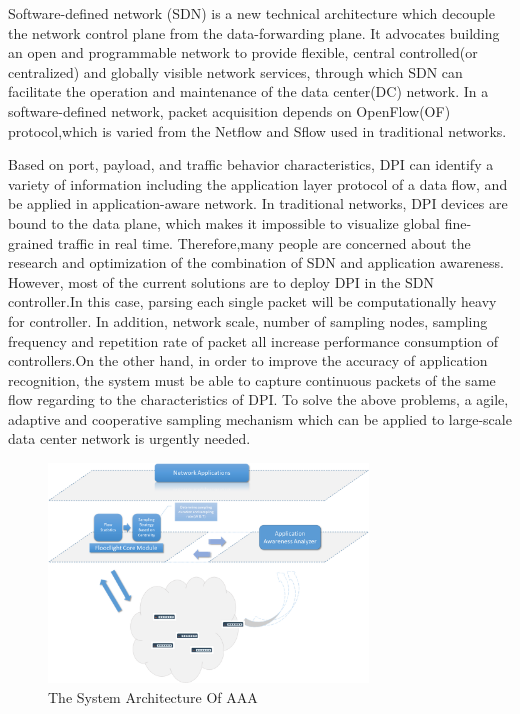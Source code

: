 \documentclass[conference,compsoc]{IEEEtran}
\begin{document}
Software-defined network (SDN) is a new technical architecture which decouple the network control plane from the data-forwarding plane. It advocates building an open and programmable network to provide flexible, central controlled(or centralized) and globally visible network services, through which SDN can facilitate the operation and maintenance of the data center(DC) network. In a software-defined network, packet acquisition depends on OpenFlow(OF) protocol,which is varied from the Netflow and Sflow used in traditional networks.

Based on port, payload, and traffic behavior characteristics, DPI can identify a variety of  information including the application layer protocol of a data flow, and be applied in application-aware network. In traditional networks, DPI devices are bound to the data plane, which makes it impossible to visualize global fine-grained traffic in real time. Therefore,many people are concerned about the research and optimization of the combination of SDN and application awareness. However, most of the current solutions are to deploy DPI in the SDN controller.In this case, parsing each single packet will be  computationally heavy for controller. In addition, network scale, number of sampling nodes, sampling frequency and repetition rate of packet all increase performance consumption of controllers.On the other hand, in order to improve the accuracy of application recognition, the system must be able to capture continuous  packets of the same flow regarding to the characteristics of DPI.
To solve the above problems, a agile, adaptive and cooperative sampling mechanism which can be applied to large-scale data center network is urgently needed. 


\begin{figure}[!hhhhhhhhhht]
\centering
\includegraphics[width=8.5cm]{images/png_architecture.png}
\caption{The System Architecture Of AAA}
\label{aaa.png}
\end{figure}
\end{document}
